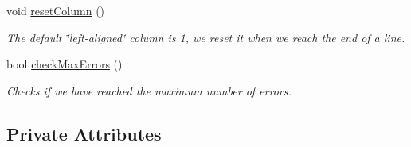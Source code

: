 \begin{DoxyCompactItemize}
void \hyperlink{classAdmin_a62813e5c17636eeef43524ad40cdaab8}{resetColumn} ()
\begin{DoxyCompactList}\small\item\em The default \char`\"{}left-\/aligned\char`\"{} column is 1, we reset it when we reach the end of a line. \end{DoxyCompactList}\item 
bool \hyperlink{classAdmin_af5cd211ee7891ec1fec719bace4b678b}{checkMaxErrors} ()
\begin{DoxyCompactList}\small\item\em Checks if we have reached the maximum number of errors. \end{DoxyCompactList}\end{DoxyCompactItemize}
\subsection*{Private Attributes}
